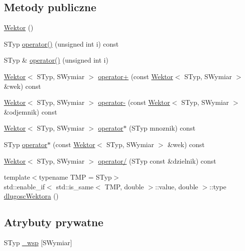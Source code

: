 \subsection*{Metody publiczne}
\begin{DoxyCompactItemize}
\item 
\mbox{\hyperlink{class_wektor_aa8478acaedd4ab9cb23dc803d779e19c}{Wektor}} ()
\item 
S\+Typ \mbox{\hyperlink{class_wektor_adc3d97e60e0488778b4b9af711c0fff9}{operator()}} (unsigned int i) const
\item 
S\+Typ \& \mbox{\hyperlink{class_wektor_a38743f00d800acff23b24447fecede37}{operator()}} (unsigned int i)
\item 
\mbox{\hyperlink{class_wektor}{Wektor}}$<$ S\+Typ, S\+Wymiar $>$ \mbox{\hyperlink{class_wektor_a08bbabfe97cf0699429571b6eed21ed8}{operator+}} (const \mbox{\hyperlink{class_wektor}{Wektor}}$<$ S\+Typ, S\+Wymiar $>$ \&wek) const
\item 
\mbox{\hyperlink{class_wektor}{Wektor}}$<$ S\+Typ, S\+Wymiar $>$ \mbox{\hyperlink{class_wektor_a1560f385977f9b4ee942347e511cbd03}{operator-\/}} (const \mbox{\hyperlink{class_wektor}{Wektor}}$<$ S\+Typ, S\+Wymiar $>$ \&odjemnik) const
\item 
\mbox{\hyperlink{class_wektor}{Wektor}}$<$ S\+Typ, S\+Wymiar $>$ \mbox{\hyperlink{class_wektor_a9810ff81924a1da75158b32c097fb329}{operator$\ast$}} (S\+Typ mnoznik) const
\item 
S\+Typ \mbox{\hyperlink{class_wektor_a80cfd984612acba04ac3daa26549ca64}{operator$\ast$}} (const \mbox{\hyperlink{class_wektor}{Wektor}}$<$ S\+Typ, S\+Wymiar $>$ \&wek) const
\item 
\mbox{\hyperlink{class_wektor}{Wektor}}$<$ S\+Typ, S\+Wymiar $>$ \mbox{\hyperlink{class_wektor_a76e4de69098c509ae0da392c218b9270}{operator/}} (S\+Typ const \&dzielnik) const
\item 
{\footnotesize template$<$typename T\+MP  = S\+Typ$>$ }\\std\+::enable\+\_\+if$<$ std\+::is\+\_\+same$<$ T\+MP, double $>$\+::value, double $>$\+::type \mbox{\hyperlink{class_wektor_a8bdafe74616e16b690feee6844423d50}{dlugosc\+Wektora}} ()
\end{DoxyCompactItemize}
\subsection*{Atrybuty prywatne}
\begin{DoxyCompactItemize}
\item 
S\+Typ \mbox{\hyperlink{class_wektor_a3ee1d2902419ae77e615280d7a62161b}{\+\_\+wsp}} \mbox{[}S\+Wymiar\mbox{]}
\end{DoxyCompactItemize}



